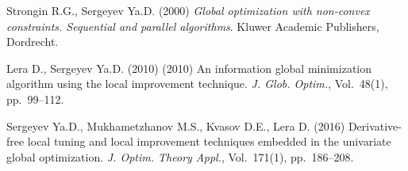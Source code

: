 \documentclass[oribibl]{llncs}
\begin{document}
\begin{thebibliography}{4}

 Strongin R.G., Sergeyev Ya.D. (2000) \emph{Global optimization with non-convex constraints. Sequential and parallel algorithms}. Kluwer Academic Publishers, Dordrecht.

 Lera D., Sergeyev Ya.D. (2010)  (2010) An information global minimization algorithm using the local improvement technique. \emph{J. Glob. Optim.}, Vol.~48(1), pp.~99--112.

 Sergeyev Ya.D., Mukhametzhanov M.S., Kvasov D.E., Lera D. (2016) Derivative-free local tuning and local improvement techniques embedded in the univariate global optimization. \emph{J. Optim. Theory Appl.}, Vol.~171(1), pp.~186--208.



\end{thebibliography}
\end{document}
